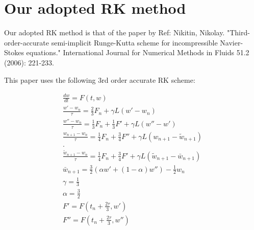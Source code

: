 \documentclass[11pt]{article}
\begin{document}
\MOONSTITLE

\section{Our adopted RK method}
Our adopted RK method is that of the paper by Ref: Nikitin, Nikolay. "Third-order-accurate semi-implicit Runge-Kutta scheme for incompressible Navier-Stokes equations." International Journal for Numerical Methods in Fluids 51.2 (2006): 221-233.

This paper uses the following 3rd order accurate RK scheme:

\begin{equation}\begin{aligned}
  \frac{dw}{dt} = F(t,w) \\
  \frac{w'-w_n}{\tau} = \frac{2}{3} F_n + \gamma L(w' - w_n) \\
  \frac{w''-w_n}{\tau} = \frac{1}{3} F_n + \frac{1}{3} F' + \gamma L(w'' - w') \\
  \frac{w_{n+1}        -w_n}{\tau} = \frac{1}{4} F_n + \frac{3}{4} F'' + \gamma L(w_{n+1} - \tilde{w}_{n+1}) \\
  . \\
  \frac{\tilde{w}_{n+1}-w_n}{\tau} = \frac{1}{4} F_n + \frac{3}{4} F'  + \gamma L(\tilde{w}_{n+1} - \bar{w}_{n+1}) \\
  \bar{w}_{n+1} = \frac{3}{2} (\alpha w' + (1-\alpha) w'') - \frac{1}{2} w_n \\
  \gamma = \frac{1}{3} \\
  \alpha = \frac{3}{2} \\
  F' = F(t_n + \frac{2\tau}{3},w') \\
  F'' = F(t_n + \frac{2\tau}{3},w'') \\
\end{aligned}\end{equation}

\newpage
\end{document}

